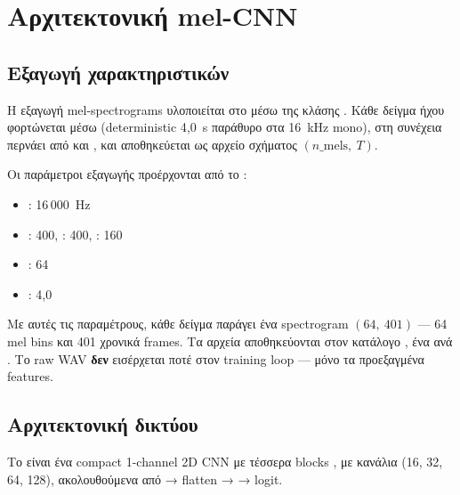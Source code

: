 \section{Αρχιτεκτονική mel-CNN}
\label{sec:mel-cnn-arch}

\subsection{Εξαγωγή χαρακτηριστικών}
\label{subsec:mel-extraction}

Η εξαγωγή mel-spectrograms υλοποιείται στο 
μέσω της κλάσης .
Κάθε δείγμα ήχου φορτώνεται μέσω 
(deterministic 4{,}0~s παράθυρο στα 16~kHz mono),
στη συνέχεια περνάει από
 και ,
και αποθηκεύεται ως  αρχείο σχήματος \((n\_\text{mels},\ T)\).

Οι παράμετροι εξαγωγής προέρχονται από το :
\begin{itemize}
  \item {}: 16\,000~Hz
  \item {}: 400, : 400, : 160
  \item {}: 64
  \item {}: 4{,}0
\end{itemize}

Με αυτές τις παραμέτρους, κάθε δείγμα παράγει ένα spectrogram
\((64,\ 401)\) — 64 mel bins και 401 χρονικά frames.
Τα  αρχεία αποθηκεύονται στον κατάλογο
, ένα ανά .
Το raw WAV \textbf{δεν} εισέρχεται ποτέ στον training loop — μόνο τα
προεξαγμένα  features.

\subsection{Αρχιτεκτονική δικτύου}
\label{subsec:mel-cnn-model}

Το  είναι ένα compact 1-channel 2D CNN με τέσσερα
blocks ,
με κανάλια (16, 32, 64, 128), ακολουθούμενα από
 → flatten →  →
 logit.

